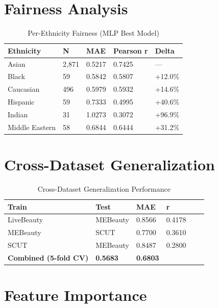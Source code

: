 \documentclass[a4paper,oneside,bibliography=totoc]{scrbook}
\begin{document}
\section{Fairness Analysis}

\begin{table}[tb]
  \centering
  \small
  \begin{tabularx}{\textwidth}{lXXXX}
    \toprule
    \textbf{Ethnicity} & \textbf{N} & \textbf{MAE} & \textbf{Pearson r} & \textbf{Delta} \\
    \midrule
    Asian & 2,871 & 0.5217 & 0.7425 & --- \\
    Black & 59 & 0.5842 & 0.5807 & +12.0\% \\
    Caucasian & 496 & 0.5979 & 0.5932 & +14.6\% \\
    Hispanic & 59 & 0.7333 & 0.4995 & +40.6\% \\
    Indian & 31 & 1.0273 & 0.3072 & +96.9\% \\
    Middle Eastern & 58 & 0.6844 & 0.6444 & +31.2\% \\
    \bottomrule
  \end{tabularx}
  \caption{Per-Ethnicity Fairness (MLP Best Model)}
  \label{tab:fairness}
\end{table}

\section{Cross-Dataset Generalization}

\begin{table}[tb]
  \centering
  \small
  \begin{tabularx}{\textwidth}{lXXXXX}
    \toprule
    \textbf{Train} & \textbf{Test} & \textbf{MAE} & \textbf{r} \\
    \midrule
    LiveBeauty & MEBeauty & 0.8566 & 0.4178 \\
    MEBeauty & SCUT & 0.7700 & 0.3610 \\
    SCUT & MEBeauty & 0.8487 & 0.2800 \\
    \midrule
    \textbf{Combined (5-fold CV)} & \textbf{0.5683} & \textbf{0.6803} \\
    \bottomrule
  \end{tabularx}
  \caption{Cross-Dataset Generalization Performance}
  \label{tab:cross_dataset}
\end{table}

\section{Feature Importance}
\end{document}
